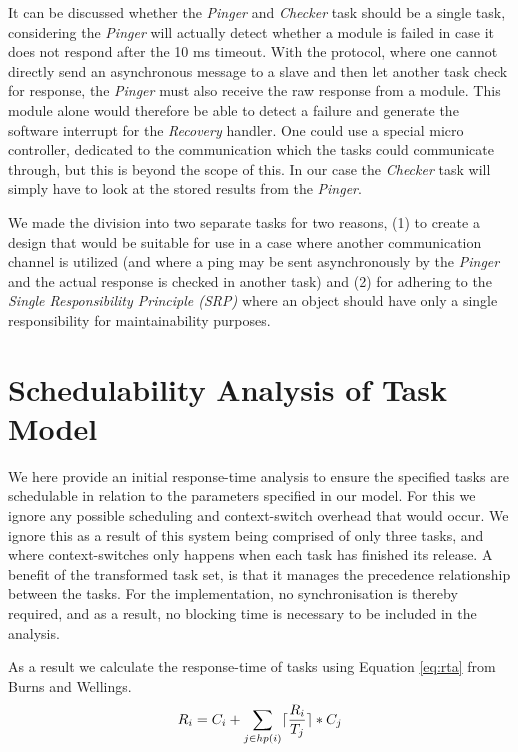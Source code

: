 It can be discussed whether the \textit{Pinger} and \textit{Checker} task should be a single task, considering the \textit{Pinger} will actually detect whether a module is failed in case it does not respond after the 10 ms timeout. With the \iic protocol, where one cannot directly send an asynchronous message to a slave and then let another task check for response, the \textit{Pinger} must also receive the raw response from a module. This module alone would therefore be able to detect a failure and generate the software interrupt for the \textit{Recovery} handler. One could use a special \iic micro controller, dedicated to the communication which the tasks could communicate through, but this is beyond the scope of this. In our case the \textit{Checker} task will simply have to look at the stored results from the \textit{Pinger}.

We made the division into two separate tasks for two reasons, (1) to create a design that would be suitable for use in a case where another communication channel is utilized (and where a ping may be sent asynchronously by the \textit{Pinger} and the actual response is checked in another task) and (2) for adhering to the \textit{Single Responsibility Principle (SRP)} where an object should have only a single responsibility for maintainability purposes.

\section{Schedulability Analysis of Task Model}
We here provide an initial response-time analysis to ensure the specified tasks are schedulable in relation to the parameters specified in our model. For this we ignore any possible scheduling and context-switch overhead that would occur. We ignore this as a result of this system being comprised of only three tasks, and where context-switches only happens when each task has finished its release. A benefit of the transformed task set, is that it manages the precedence relationship between the tasks. For the implementation, no synchronisation is thereby required, and as a result, no blocking time is necessary to be included in the analysis.

As a result we calculate the response-time of tasks using Equation \ref{eq:rta} from Burns and Wellings.
\begin{equation}
\label{eq:rta}
     R_{i} = C_{i} + \sum\limits_{j\in hp(i)} \lceil\frac{R_{i}}{T_{j}}\rceil*C_{j}
\end{equation}

